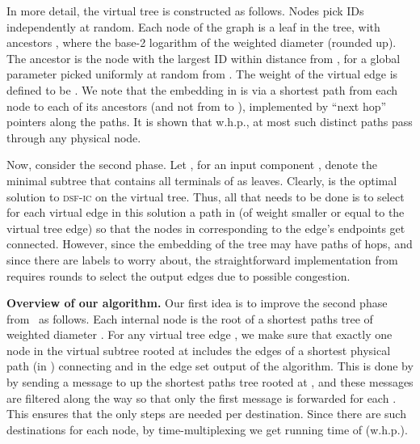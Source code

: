 \documentclass[letterpaper,11pt]{article}
\newcommand{\sfic}{\textsc{dsf-ic}\xspace}
\renewcommand{\paragraph}[1]{\smallskip\par\noindent\textbf{#1}}
\begin{document}
In more detail, the virtual tree is constructed as follows.  Nodes
pick IDs independently at random.  Each node of the graph is a leaf in
the tree, with ancestors , where  the base-2 logarithm of
the weighted diameter (rounded up). The  ancestor  is the
node with the largest ID within distance  from , for a
global parameter  picked uniformly at random from . The
weight of the virtual edge  is defined to be
.  We note that the embedding in  is via a shortest path
from each node  to each of its  ancestors (and not from
 to ), implemented by ``next hop'' pointers along the
paths.  It is shown that w.h.p., at most  such distinct
paths pass through any physical node.

Now, consider the second phase. Let , for an input component ,  denote the minimal
subtree that contains all terminals of  as leaves.
Clearly,  is the optimal solution
to \sfic on the virtual tree. Thus, all that needs to be done is to select
for each virtual edge in this solution a path in  (of weight smaller or
equal to the virtual tree edge) so that the nodes in  corresponding to the
edge's endpoints get connected. However, since the embedding of the
tree may have paths of  hops, and since there are  labels
to worry about,  the straightforward
implementation from~\cite{KKMPT-12} requires  rounds to
select the output edges due to possible
congestion.


\paragraph{Overview of our algorithm.}
Our first idea is to improve  the second phase from~\cite{KKMPT-12} as
follows.  Each internal node  is the root of a shortest paths
tree of weighted diameter .
For  any virtual tree edge
, we
make sure that exactly one node  in the virtual subtree rooted at 
includes the edges of a shortest physical path 
(in ) connecting  and  in the edge set  output of the
algorithm. 
This is done by  by sending  a message  to  up
the shortest paths tree rooted at , and these messages are
filtered along the way so that only the first 
 message is forwarded for each .
This ensures that the only  steps are needed per
destination. 
Since there are  such destinations for each node, by
time-multiplexing 
we get running time of  (w.h.p.). 
\end{document}
